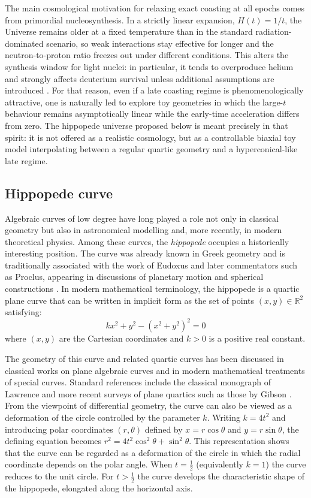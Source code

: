 \documentclass[preprint,12pt]{elsarticle}
\begin{document}
The main cosmological motivation for relaxing exact coasting at all epochs comes from primordial nucleosynthesis. In a strictly linear expansion, $H(t)=1/t$, the Universe remains older at a fixed temperature than in the standard radiation-dominated scenario, so weak interactions stay effective for longer and the neutron-to-proton ratio freezes out under different conditions. This alters the synthesis window for light nuclei: in particular, it tends to overproduce helium and strongly affects deuterium survival unless additional assumptions are introduced \cite{sethi1999coasting, dev2002coasting}. For that reason, even if a late coasting regime is phenomenologically attractive, one is naturally led to explore toy geometries in which the large-$t$ behaviour remains asymptotically linear while the early-time acceleration differs from zero. The hippopede universe proposed below is meant precisely in that spirit: it is not offered as a realistic cosmology, but as a controllable biaxial toy model interpolating between a regular quartic geometry and a hyperconical-like late regime.

\subsection{Hippopede curve}
Algebraic curves of low degree have long played a role not only in classical geometry but also in astronomical modelling and, more recently, in modern theoretical physics. Among these curves, the \emph{hippopede} occupies a historically interesting position. The curve was already known in Greek geometry and is traditionally associated with the work of Eudoxus and later commentators such as Proclus, appearing in discussions of planetary motion and spherical constructions \cite{Gregory_2011, Taub2020, BotteriCasazza2023}. In modern mathematical terminology, the hippopede is a quartic plane curve that can be written in implicit form as the set of points $(x,y) \in \mathbb{R}^2$ satisfying:
\begin{equation}
    k x^2 + y^2 - (x^2+y^2)^2 = 0
\end{equation}
where $(x,y)$ are the Cartesian coordinates and $k > 0$ is a positive real constant.


The geometry of this curve and related quartic curves has been discussed in classical works on plane algebraic curves and in modern mathematical treatments of special curves. Standard references include the classical monograph of Lawrence \cite{lawrence1972catalogue} and more recent surveys of plane quartics such as those by Gibson \cite{gibson2001elementary}. From the viewpoint of differential geometry, the curve can also be viewed as a deformation of the circle controlled by the parameter $k$. Writing $k=4t^2$ and introducing polar coordinates $(r,\theta)$ defined by $x=r\cos\theta$ and $y=r\sin\theta$, the defining equation becomes $r^2 = 4t^2\cos^2\theta + \sin^2\theta$. This representation shows that the curve can be regarded as a deformation of the circle in which the radial coordinate depends on the polar angle. When $t=\tfrac12$ (equivalently $k=1$) the curve reduces to the unit circle. For $t >\tfrac12$ the curve develops the characteristic shape of the hippopede, elongated along the horizontal axis.
\end{document}
